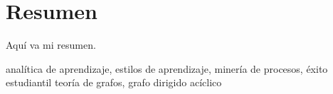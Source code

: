 \chapter*{Resumen}

Aquí va mi resumen.

\small{ analítica de aprendizaje, \; estilos de aprendizaje, \; minería de procesos, \; éxito estudiantil \; teoría de grafos, \; grafo dirigido acíclico}

\newpage
